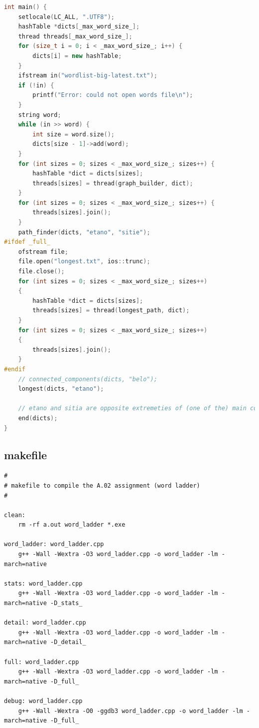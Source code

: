\documentclass[a4paper,11pt]{article}
\begin{document}
\begin{lstlisting}[language=c++,label={lst:lstlisting}]
int main() {
    setlocale(LC_ALL, ".UTF8");
    hashTable *dicts[_max_word_size_];
    thread threads[_max_word_size_];
    for (size_t i = 0; i < _max_word_size_; i++) {
        dicts[i] = new hashTable;
    }
    ifstream in("wordlist-big-latest.txt");
    if (!in) {
        printf("Error: could not open words file\n");
    }
    string word;
    while (in >> word) {
        int size = word.size();
        dicts[size - 1]->add(word);
    }
    for (int sizes = 0; sizes < _max_word_size_; sizes++) {
        hashTable *dict = dicts[sizes];
        threads[sizes] = thread(graph_builder, dict);
    }
    for (int sizes = 0; sizes < _max_word_size_; sizes++) {
        threads[sizes].join();
    }
    path_finder(dicts, "etano", "sitie");
#ifdef _full_
    ofstream file;
    file.open("longest.txt", ios::trunc);
    file.close();
    for (int sizes = 0; sizes < _max_word_size_; sizes++)
    {
        hashTable *dict = dicts[sizes];
        threads[sizes] = thread(longest_path, dict);
    }
    for (int sizes = 0; sizes < _max_word_size_; sizes++)
    {
        threads[sizes].join();
    }
#endif
    // connected_components(dicts, "belo");
    longest(dicts, "etano");

    // etano and sitia are opposite extremeties of (one of the) main connected component, as they show up in lots of diameters
    end(dicts);
}
    \end{lstlisting}
    
    \subsection{makefile}
     \begin{lstlisting}[style=makefile,label={lst:lstlisting}]
#
# makefile to compile the A.02 assignment (word ladder)
#

clean:
	rm -rf a.out word_ladder *.exe

word_ladder: word_ladder.cpp
	g++ -Wall -Wextra -O3 word_ladder.cpp -o word_ladder -lm -march=native

stats: word_ladder.cpp
	g++ -Wall -Wextra -O3 word_ladder.cpp -o word_ladder -lm -march=native -D_stats_

detail: word_ladder.cpp
	g++ -Wall -Wextra -O3 word_ladder.cpp -o word_ladder -lm -march=native -D_detail_

full: word_ladder.cpp
	g++ -Wall -Wextra -O3 word_ladder.cpp -o word_ladder -lm -march=native -D_full_

debug: word_ladder.cpp
	g++ -Wall -Wextra -O0 -ggdb3 word_ladder.cpp -o word_ladder -lm -march=native -D_full_
\end{lstlisting}
\end{document}
